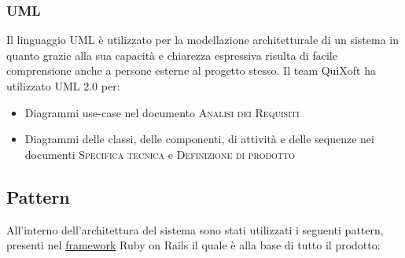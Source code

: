 \documentclass[11pt,a4paper]{article}
\begin{document}
\subsubsection{UML}
Il linguaggio UML è utilizzato per la modellazione architetturale di un sistema in quanto grazie alla sua capacità e chiarezza espressiva risulta di facile comprensione anche a persone esterne al progetto stesso. Il team QuiXoft ha utilizzato UML 2.0 per:
\begin{itemize}
 \item Diagrammi use-case nel documento \textsc{Analisi dei Requisiti}
 \item Diagrammi delle classi, delle componenti, di attività e delle sequenze nei documenti \textsc{Specifica tecnica} e \textsc{Definizione di prodotto}
\end{itemize}
\subsection{Pattern}
All'interno dell'architettura del sistema sono stati utilizzati i seguenti pattern, presenti nel \underline{framework} Ruby on Rails il quale è alla base di tutto il prodotto:
\end{document}
